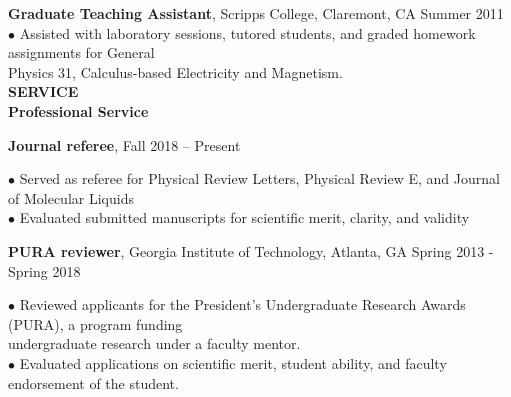 \documentclass[10pt]{article}
\newenvironment{changemargin}[2]{%
  \list{}{\rightmargin#2\leftmargin#1
    \parsep=0pt\topsep=1pt\partopsep=0pt}
\item[]} {\endlist}
\newenvironment{indentmore}{\begin{changemargin}{10pt}{0cm}}{\end{changemargin}}
\begin{document}
{\bf  Graduate Teaching Assistant}, Scripps College, Claremont, CA \hfill Summer 2011\\
\hspace*{10pt}$\bullet$ Assisted with laboratory sessions, tutored students, and graded homework assignments for General\\ \hspace*{15pt} Physics 31, Calculus-based Electricity and Magnetism. \\


%
%
%
%


\textbf{\large SERVICE}\\
{\bf Professional Service}
\begin{indentmore}
{\bf Journal referee}, \hfill Fall 2018 -- Present
\begin{indentmore}
$\bullet$ Served as referee for Physical Review Letters, Physical Review E, and Journal of Molecular Liquids\\
$\bullet$ Evaluated submitted manuscripts for scientific merit, clarity, and validity\\
\end{indentmore}

{\bf PURA reviewer}, Georgia Institute of Technology, Atlanta, GA \hfill Spring 2013 - Spring 2018
\begin{indentmore}
$\bullet$ Reviewed applicants for the President's Undergraduate Research Awards (PURA), a program funding \\ \hspace*{5pt} undergraduate research under a faculty mentor.\\
$\bullet$ Evaluated applications on scientific merit, student ability, and faculty endorsement of the student.\\
\end{indentmore}
\end{indentmore}
\end{document}
